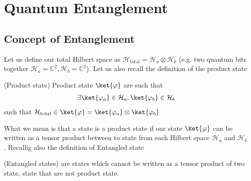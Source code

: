 \chapter{Quantum Entanglement}%
\label{cha:Quantum Entanglement}

\section{Concept of Entanglement}

Let us define our total Hilbert space as $\mathcal{H}_{\text{total}} = \mathcal{H}_a \otimes \mathcal{H}_b$ (e.g. two quantum bits together $\mathcal{H}_a = \mathbb{C}^2, \mathcal{H}_b = \mathbb{C}^2$). Let us also recall the definition of the product state
\begin{definition}{(Product state)}
Product state $\ket{\varphi}$ are such that 
\begin{align*} 
	\exists \ket{\varphi_a} \in \mathcal{H}_a, \ket{\varphi_b} \in \mathcal{H}_b 
\end{align*}
such that $\mathcal{H}_{\text{total}} \in \ket{\varphi} = \ket{\varphi_a} \otimes \ket{\varphi_b}$
\end{definition}
What we mean is that a state is a product state if our state $\ket{\varphi}$ can be written as a tensor product between to state from each Hilbert space $\mathcal{H}_a$ and $\mathcal{H}_b$. Recallig also the definition of Entangled state

\begin{definition}{(Entangled states)}
 are states which cannot be written as a tensor product of two state, state that are not product state.
\end{definition} 



